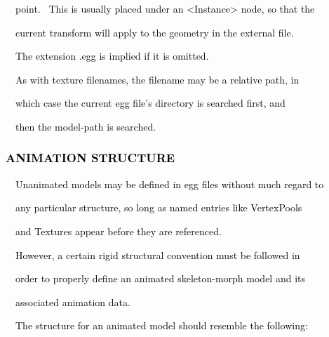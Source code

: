\documentclass[a4paper]{article}
\newcommand\textstyleOOoComputerKeyWord[1]{\textrm{\textcolor[rgb]{0.0,0.0,0.5019608}{#1}}}
\begin{document}
{\color{black}
\textstyleOOoComputerKeyWord{\textcolor{black}{\ \ point. \ This is usually placed under an
{\textless}Instance{\textgreater} node, so that the}}}

{\color{black}
\textstyleOOoComputerKeyWord{\textcolor{black}{\ \ current transform will apply to the geometry in the external file.}}}

{\color{black}
\textstyleOOoComputerKeyWord{\textcolor{black}{\ \ The extension {\textquotedbl}.egg{\textquotedbl} is implied if it is
omitted.}}}


\bigskip

{\color{black}
\textstyleOOoComputerKeyWord{\textcolor{black}{\ \ As with texture filenames, the filename may be a relative path, in}}}

{\color{black}
\textstyleOOoComputerKeyWord{\textcolor{black}{\ \ which case the current egg file's directory is searched first, and}}}

{\color{black}
\textstyleOOoComputerKeyWord{\textcolor{black}{\ \ then the model-path is searched.}}}

\clearpage\subsubsection[ANIMATION STRUCTURE]{\textstyleOOoComputerKeyWord{\textcolor{black}{ANIMATION STRUCTURE}}}
\hypertarget{RefHeading7726869075401}{}
\bigskip

{\color{black}
\textstyleOOoComputerKeyWord{\textcolor{black}{\ \ Unanimated models may be defined in egg files without much regard
to}}}

{\color{black}
\textstyleOOoComputerKeyWord{\textcolor{black}{\ \ any particular structure, so long as named entries like
VertexPools}}}

{\color{black}
\textstyleOOoComputerKeyWord{\textcolor{black}{\ \ and Textures appear before they are referenced.}}}


\bigskip

{\color{black}
\textstyleOOoComputerKeyWord{\textcolor{black}{\ \ However, a certain rigid structural convention must be followed in}}}

{\color{black}
\textstyleOOoComputerKeyWord{\textcolor{black}{\ \ order to properly define an animated skeleton-morph model and its}}}

{\color{black}
\textstyleOOoComputerKeyWord{\textcolor{black}{\ \ associated animation data.}}}


\bigskip

{\color{black}
\textstyleOOoComputerKeyWord{\textcolor{black}{\ \ The structure for an animated model should resemble the following:}}}
\end{document}
